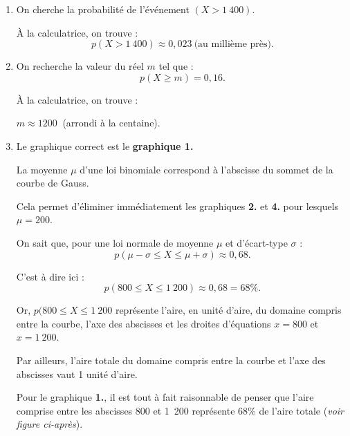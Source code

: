 \begin{corrige}
     \par
     \begin{enumerate}
          \item %
          On cherche la probabilité de l'événement $(X>1~400)$.
          \par
          \`A la calculatrice, on trouve :
          \[ p(X>1~400) \approx 0,023\ \text{(au millième près)}. \]
          \par
          \item %
          On recherche la valeur du réel $m$ tel que :
          \[ p(X \geqslant m) = 0,16. \]
          \par
          \`A la calculatrice, on trouve :
          \par
          $m \approx 1200\ $ (arrondi à la centaine).
          \item %
          Le graphique correct est le \textbf{graphique 1.}
          \par
          La moyenne $\mu$ d'une loi binomiale correspond à l'abscisse du sommet de la courbe de Gauss.
          \par
          Cela permet d'éliminer immédiatement les graphiques \textbf{2.} et \textbf{4.} pour lesquels $\mu =200$.
          \par
          On sait que, pour une loi normale de moyenne $\mu$ et d'écart-type $\sigma$ :
          \[ p(\mu -\sigma \leqslant X \leqslant\mu +\sigma ) \approx 0,68. \]
          \par
          C'est à dire ici :
          \[ p(800 \leqslant X \leqslant 1\ 200 ) \approx 0,68 = 68\%. \]
          \par
          Or, $p(800 \leqslant X \leqslant 1\ 200$ représente l'aire, en unité d'aire, du domaine compris entre la courbe, l'axe des abscisses et les droites d'équations $x=800$ et $x=1\ 200$.
          \par
          Par ailleurs, l'aire totale du domaine compris entre la courbe et l'axe des abscisses vaut 1 unité d'aire.
          \par
          Pour le graphique \textbf{1.}, il est tout à fait raisonnable de penser que l'aire comprise entre les abscisses 800 et 1\ 200 représente 68\% de l'aire totale (\textit{voir figure ci-après}).

\end{enumerate}
\end{corrige}
